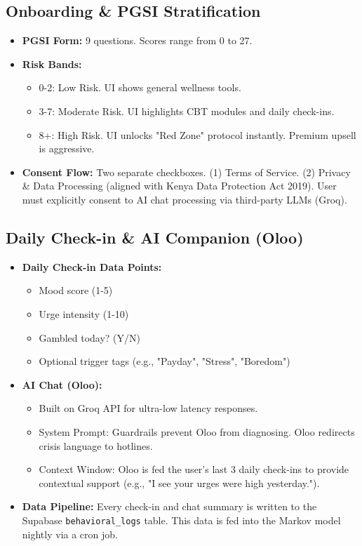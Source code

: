 \documentclass[11pt,a4paper]{article}
\begin{document}
\subsection{Onboarding \& PGSI Stratification}
\begin{itemize}
    \item \textbf{PGSI Form:} 9 questions. Scores range from 0 to 27.
    \item \textbf{Risk Bands:}
    \begin{itemize}
        \item 0-2: Low Risk. UI shows general wellness tools.
        \item 3-7: Moderate Risk. UI highlights CBT modules and daily check-ins.
        \item 8+: High Risk. UI unlocks "Red Zone" protocol instantly. Premium upsell is aggressive.
    \end{itemize}
    \item \textbf{Consent Flow:} Two separate checkboxes. (1) Terms of Service. (2) Privacy \& Data Processing (aligned with Kenya Data Protection Act 2019). User must explicitly consent to AI chat processing via third-party LLMs (Groq).
\end{itemize}

\subsection{Daily Check-in \& AI Companion (Oloo)}
\begin{itemize}
    \item \textbf{Daily Check-in Data Points:}
    \begin{itemize}
        \item Mood score (1-5)
        \item Urge intensity (1-10)
        \item Gambled today? (Y/N)
        \item Optional trigger tags (e.g., "Payday", "Stress", "Boredom")
    \end{itemize}
    \item \textbf{AI Chat (Oloo):}
    \begin{itemize}
        \item Built on Groq API for ultra-low latency responses.
        \item System Prompt: Guardrails prevent Oloo from diagnosing. Oloo redirects crisis language to hotlines.
        \item Context Window: Oloo is fed the user's last 3 daily check-ins to provide contextual support (e.g., "I see your urges were high yesterday.").
    \end{itemize}
    \item \textbf{Data Pipeline:} Every check-in and chat summary is written to the Supabase \texttt{behavioral\_logs} table. This data is fed into the Markov model nightly via a cron job.
\end{itemize}
\end{document}
